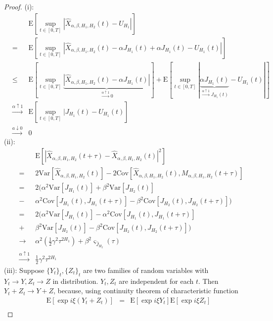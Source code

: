 \documentclass[a4paper, twoside, 11pt]{article}
\theoremstyle{definition}
\begin{document}
  \begin{proof}
(i): 
\begin{eqnarray*}
  &&\mathrm{E}[\sup\limits_{t\in[0,T]}|\hat{X}_{\alpha,\beta,H_1,H_2}(t) - U_{H_1}|]\\
  &=&\mathrm{E} [\sup\limits_{t\in[0,T]}|\hat{X}_{\alpha,\beta,H_1,H_2}(t) - \alpha J_{H_1}(t) + \alpha J_{H_1}(t) - U_{H_1}(t)|]\\
  &\le&\mathrm{E} [\sup\limits_{t\in[0,T]}\underbrace{|\hat{X}_{\alpha,\beta,H_1,H_2}(t) - \alpha J_{H_1}(t)|}_{\overset{\alpha\uparrow 1}{\rightarrow}0 }] + \mathrm{E} [\sup\limits_{t\in[0,T]}|\underbrace{\alpha J_{H_1}(t)}_{\overset{\alpha\uparrow 1}{\rightarrow} J_{H_1}(t)} - U_{H_1}(t)|]\\ 
  &\overset{\alpha\uparrow 1}{\rightarrow}&  \mathrm{E} [\sup\limits_{t\in[0,T]}|J_{H_1}(t) - U_{H_1}(t)]\\
	&\overset{a\downarrow 0}{\rightarrow}& 0
\end{eqnarray*}
(ii):
\begin{eqnarray*}
  && \mathrm{E}[|\hat{X}_{\alpha, \beta, H_1, H_2}(t+\tau) - \hat{X}_{\alpha, \beta, H_1, H_2}(t)|^2]\\
  &=& 2\mathrm{Var}[\hat{X}_{\alpha, \beta, H_1, H_2}(t)] - 2\mathrm{Cov}[\hat{X}_{\alpha, \beta, H_1, H_2}(t), M_{\alpha, \beta, H_1, H_2}(t+\tau)]\\
	&=& 2(\alpha^2\mathrm{Var}[J_{H_1}(t)] + \beta^2\mathrm{Var}[J_{H_2}(t)]  \\
	&-& \alpha^2\mathrm{Cov}[J_{H_1}(t), J_{H_1}(t+\tau)] - \beta^2\mathrm{Cov}[J_{H_2}(t), J_{H_2}(t+\tau)])\\
    &=&  2(\alpha^2\mathrm{Var}[J_{H_1}(t)] - \alpha^2\mathrm{Cov}[J_{H_1}(t), J_{H_1}(t+\tau)] \\
	&+& \beta^2\mathrm{Var}[J_{H_2}(t)] - \beta^2\mathrm{Cov}[J_{H_2}(t), J_{H_2}(t+\tau)])\\
	&\rightarrow& \alpha^2(\frac{1}{2}\gamma^2 \tau^{2H_1}) + \beta^2\varsigma_{\hat{J}_{H_2}}(\tau)  \\
	&\overset{\alpha\uparrow 1}{\rightarrow}& \frac{1}{2}\gamma^2\tau^{2H_1}
\end{eqnarray*}
(iii): Suppose $\{Y_t\}_t, \{Z_t\}_t$ are two families of random variables with $Y_t \rightarrow Y, Z_t \rightarrow Z$ in distribution. $Y_t, Z_t$ are independent for each $t$. Then  $Y_t + Z_t \rightarrow Y+Z$, because, using continuity theorem of characteristic function
\begin{eqnarray*}
  \mathrm{E}[\exp{i\xi(Y_t+Z_t)}]&=& \mathrm{E}[\exp{i\xi Y_t}]\mathrm{E}[\exp{i\xi Z_t}]\\

\end{eqnarray*}
\end{proof}
\end{document}
